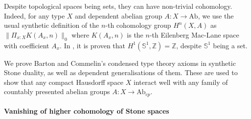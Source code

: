 \documentclass[letterpaper]{../util/easychair}
\newcommand{\Z}{\mathbb{Z}}
\newcommand{\N}{\mathbb{N}}
\newcommand{\bS}{\mathbb{S}}
\begin{document}
Despite topological spaces being sets, they can have non-trivial cohomology. Indeed, for any type $X$ and dependent abelian group $A:X\to \mathrm{Ab}$, we use the usual synthetic definition of the $n$-th cohomology group $H^n(X,A)$ as $\|\Pi_{x:X}K(A_x,n)\|_0$ where $K(A_x,n)$ is the $n$-th Eilenberg Mac-Lane space with coefficient $A_x$. In \cite{synthetic-stone-duality}, it is proven that $H^1(\bS^1,\Z)=\Z$, despite $\bS^1$ being a set.

We prove Barton and Commelin's condensed type theory axioms in synthetic Stone duality, as well as dependent generalisations of them. These are used to show that any compact Hausdorff space $X$ interact well with any family of countably presented abelian groups $A:X\to \mathrm{Ab}_{cp}$.





\paragraph*{Vanishing of higher cohomology of Stone spaces}
\end{document}
